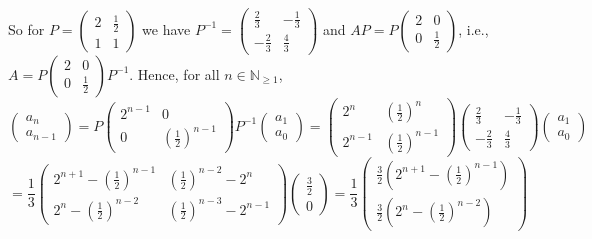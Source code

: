 \begin{solution}
\[    \]
    So for \( P = \begin{pmatrix} 2 & \frac{1}{2} \\ 1 & 1 \end{pmatrix} \) we have \( P^{-1} = \begin{pmatrix} \frac{2}{3} & -\frac{1}{3} \\ -\frac{2}{3} & \frac{4}{3} \end{pmatrix} \) and \( AP = P \begin{pmatrix} 2 & 0 \\ 0 & \frac{1}{2} \end{pmatrix} \), i.e., \( A = P \begin{pmatrix} 2 & 0 \\ 0 & \frac{1}{2} \end{pmatrix} P^{-1} \). Hence, for all \( n \in \mathbb{N}_{\geq 1} \),
    \[
        \begin{pmatrix} a_n \\ a_{n-1} \end{pmatrix} = P \begin{pmatrix} 2^{n-1} & 0 \\ 0 &
            \left(\frac{1}{2}\right)^{n-1} \end{pmatrix} P^{-1} \begin{pmatrix} a_1 \\ a_0 \end{pmatrix}
        = \begin{pmatrix} 2^n & \left(\frac{1}{2}\right)^n \\ 2^{n-1} &
            \left(\frac{1}{2}\right)^{n-1} \end{pmatrix} \begin{pmatrix} \frac{2}{3} & -\frac{1}{3} \\
            -\frac{2}{3} & \frac{4}{3} \end{pmatrix} \begin{pmatrix} a_1 \\ a_0 \end{pmatrix}
    \]
    \[
        = \frac{1}{3} \begin{pmatrix} 2^{n+1} - \left(\frac{1}{2}\right)^{n-1} & \left(\frac{1}{2}\right)^{n-2} - 2^n \\ 2^n - \left(\frac{1}{2}\right)^{n-2} & \left(\frac{1}{2}\right)^{n-3} - 2^{n-1} \end{pmatrix} \begin{pmatrix} \frac{3}{2} \\ 0 \end{pmatrix} = \frac{1}{3} \begin{pmatrix} \frac{3}{2}\left(2^{n+1} - \left(\frac{1}{2}\right)^{n-1}\right) \\ \frac{3}{2}\left(2^n - \left(\frac{1}{2}\right)^{n-2}\right) \end{pmatrix}
\]
\end{solution}

